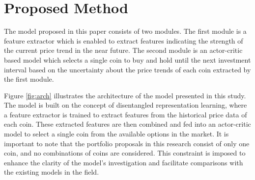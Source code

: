 \section{Proposed Method}
The model proposed in this paper consists of two modules. The first module is a feature extractor which is enabled to extract features indicating the strength of the current price trend in the near future. The second module is an actor-critic based model which selects a single coin to buy and hold until the next investment interval based on the uncertainty about the price trends of each coin extracted by the first module. 

Figure \ref{fig:arch} illustrates the architecture of the model presented in this study. The model is built on the concept of disentangled representation learning, where a feature extractor is trained to extract features from the historical price data of each coin. These extracted features are then combined and fed into an actor-critic model to select a single coin from the available options in the market. It is important to note that the portfolio proposals in this research consist of only one coin, and no combinations of coins are considered. This constraint is imposed to enhance the clarity of the model's investigation and facilitate comparisons with the existing models in the field.



